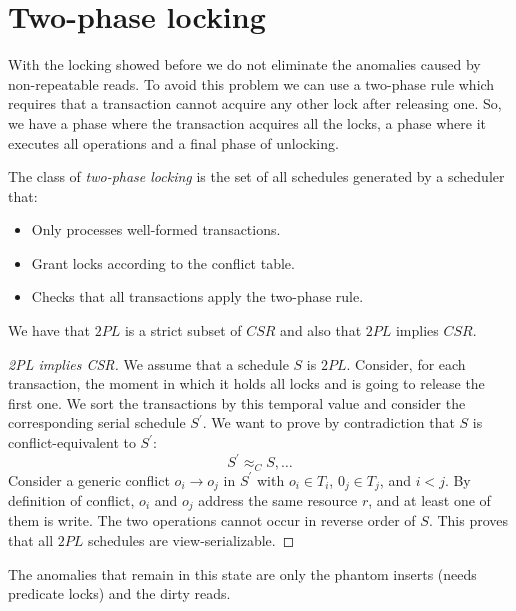 \section{Two-phase locking}

With the locking showed before we do not eliminate the anomalies caused by non-repeatable reads. To avoid this problem we can use a two-phase rule which requires that a 
transaction cannot acquire any other lock after releasing one. So, we have a phase where the transaction acquires all the locks, a phase where it executes all operations and 
a final phase of unlocking. 
\begin{definition}
    The class of \emph{two-phase locking} is the set of all schedules generated by a scheduler that: 
    \begin{itemize}
        \item Only processes well-formed transactions. 
        \item Grant locks according to the conflict table. 
        \item Checks that all transactions apply the two-phase rule.             
    \end{itemize}
\end{definition}
We have that $2PL$ is a strict subset of $CSR$ and also that $2PL$ implies $CSR$. 
\begin{proof}[2PL implies CSR]
    We assume that a schedule $S$ is $2PL$. Consider, for each transaction, the moment in which it holds all locks and is going to release the first one. 
    We sort the transactions by this temporal value and consider the corresponding serial schedule $S^{'}$. We want to prove by contradiction that $S$ is conflict-equivalent to 
    $S^{'}$: 
    \[S^{'}\approx_CS,\dots\]
    Consider a generic conflict $o_i \rightarrow o_j$ in $S^{'}$ with $o_i \in T_i$, $0_j \in T_j$, and $i<j$. 
    By definition of conflict, $o_i$ and $o_j$ address the same resource $r$, and at least one of them is write. The two operations cannot occur in reverse order of $S$. 
    This proves that all $2PL$ schedules are view-serializable. 
\end{proof}
The anomalies that remain in this state are only the phantom inserts (needs predicate locks) and the dirty reads. 